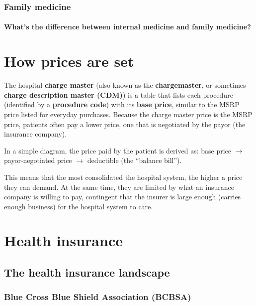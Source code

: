\documentclass{article}
\begin{document}
\subsubsection{Family medicine} \cite{what-is-family-medicine}

\begin{tcolorbox}[colframe=Melon, colback=Melon!30]
\paragraph{What's the difference between internal medicine and family medicine?} \cite{diff-bt-internal-family}
\end{tcolorbox}

\section{How prices are set}

The hospital {\bf charge master} (also known as the {\bf chargemaster}, or sometimes {\bf charge description master (CDM)}) is a table that lists each procedure (identified by a {\bf procedure code}) with its {\bf base price}, similar to the MSRP price listed for everyday purchases. Because the charge master price is the MSRP price, patients often pay a lower price, one that is negotiated by the payor (the insurance company).

In a simple diagram, the price paid by the patient is derived as: base price $\rightarrow$ payor-negotiated price $\rightarrow$ deductible (the ``balance bill'').

This means that the most consolidated the hospital system, the higher a price they can demand. At the same time, they are limited by what an insurance company is willing to pay, contingent that the insurer is large enough (carries enough business) for the hospital system to care.

\section{Health insurance}

\subsection{The health insurance landscape}

\subsubsection{Blue Cross Blue Shield Association (BCBSA)}
\end{document}
